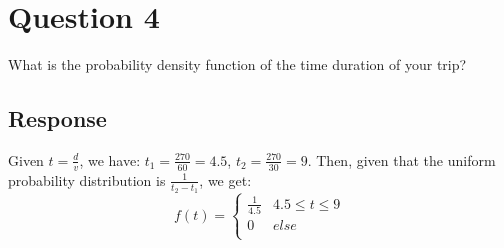 \documentclass[13pt]{article}
\begin{document}
\newpage
\section*{Question 4}
What is the probability density function of the time duration of your trip?

\subsection*{Response}
Given $t = \frac{d}{v}$, we have:
$t_1 = \frac{270}{60} = 4.5$, $t_2 = \frac{270}{30} = 9$. Then, given that the
uniform probability distribution is $\frac{1}{t_2 - t_1}$, we get:
\[f(t) =
  \begin{cases}
    \frac{1}{4.5} & 4.5 \leq t \leq 9 \\
    0 & else \\
  \end{cases}
\]
\end{document}
